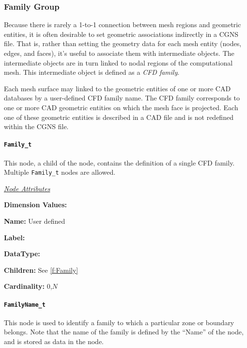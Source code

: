 \subsubsection{Family Group}

Because there is rarely a 1-to-1 connection between mesh regions and
geometric entities, it is often desirable to set geometric associations
indirectly in a CGNS file.
That is, rather than setting the geometry data for each mesh entity
(nodes, edges, and faces), it's useful to associate them with
intermediate objects.
The intermediate objects are in turn linked to nodal regions of the
computational mesh.
This intermediate object is defined as a \emph{CFD family}.

Each mesh surface may linked to the geometric entities of one or more CAD
databases by a user-defined CFD family name.
The CFD family corresponds to one or more CAD geometric entities on which
the mesh face is projected.
Each one of these geometric entities is described in a CAD file and is
not redefined within the CGNS file.

\paragraph{\texttt{Family\_t}}

This node, a child of the  node, contains the
definition of a single CFD family.
Multiple \texttt{Family\_t} nodes are allowed.

\textit{\uline{Node Attributes}}
\begin{Ventryic}{\textbf{Dimension Values:}}
\item [\textbf{Name:}]
      User defined
\item [\textbf{Label:}]
\item [\textbf{DataType:}]
\item [\textbf{Children:}]
      See \autoref{f:Family}
\item [\textbf{Cardinality:}]
      0,$N$
\end{Ventryic}

\paragraph{\texttt{FamilyName\_t}}

This node is used to identify a family to which
a particular zone or boundary belongs.
Note that the name of the family is defined by the ``Name''
of the  node, and is stored as data in the
 node.

